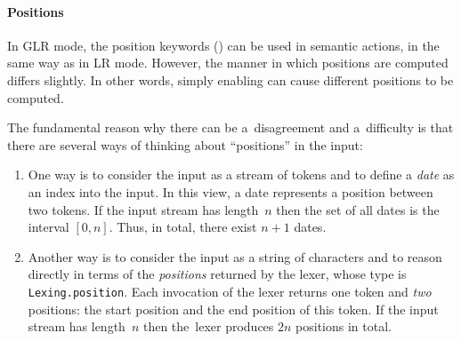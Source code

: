 

\paragraph{Positions}
\label{sec:GLR:positions}

In GLR mode, the position keywords () can be used in
semantic actions, in the same way as in LR mode. However, the
manner in which positions are computed differs slightly. In other words,
simply enabling \oGLR can cause different positions to be computed.

The fundamental reason why there can be a~disagreement and a~difficulty is
that there are several ways of thinking about ``positions'' in the input:
%
\begin{enumerate}
\item
  One way is to consider the input as a stream of tokens
  and to define a \emph{date} as an index into the input.
  In this view, a date represents a position between
  two tokens. If the input stream has length~$n$ then
  the set of all dates is the interval $[0, n]$.
  Thus, in total, there exist $n+1$ dates.
\item
  Another way is to consider the input as a string of characters
  and to reason directly in terms of the \emph{positions}
  returned by the lexer, whose type is \verb+Lexing.position+.
  Each invocation of the lexer returns one token and \emph{two} positions:
  the start position and the end position of this token.
  If the input stream has length~$n$ then
  the~lexer produces $2n$ positions in total.
\end{enumerate}

